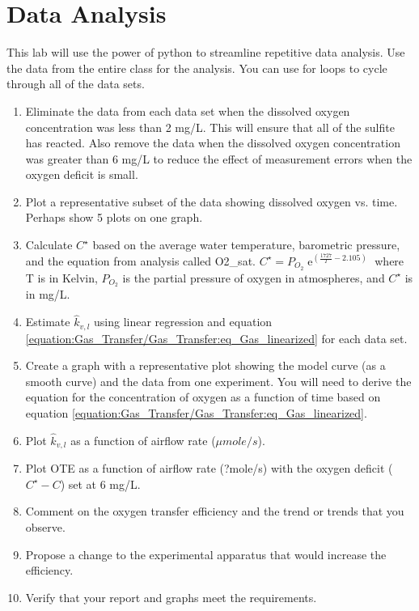 \documentclass[letterpaper,10pt,english]{sphinxmanual}
\begin{document}
\section{Data Analysis}
\label{\detokenize{Gas_Transfer/Gas_Transfer:data-analysis}}\label{\detokenize{Gas_Transfer/Gas_Transfer:heading-gas-transfer-data-analysis}}
This lab will use the power of python to streamline repetitive data analysis. Use the data from the entire class for the analysis. You can use for loops to cycle through all of the data sets.
\begin{enumerate}
\item {} 
Eliminate the data from each data set when the dissolved oxygen concentration was less than 2 mg/L. This will ensure that all of the sulfite has reacted. Also remove the data when the dissolved oxygen concentration was greater than 6 mg/L to reduce the effect of measurement errors when the oxygen deficit is small.

\item {} 
Plot a representative subset of the data showing dissolved oxygen vs. time. Perhaps show 5 plots on one graph.

\item {} 
Calculate \(C^{\star}\) based on the average water temperature, barometric pressure, and the equation from  analysis called O2\_sat. \(C^{\star} =P_{O_{2}} {\mathop{e}\nolimits^{\left(\frac{1727}{T} -2.105\right)}}\) where T is in Kelvin, \(P_{O_{2} }\) is the partial pressure of oxygen in atmospheres, and \(C^{\star}\) is in mg/L.

\item {} 
Estimate \(\hat{k}_{v,l}\) using linear regression and equation \eqref{equation:Gas_Transfer/Gas_Transfer:eq_Gas_linearized} for each data set.

\item {} 
Create a graph with a representative plot showing the model curve (as a smooth curve) and the data from one experiment. You will need to derive the equation for the concentration of oxygen as a function of time based on equation \eqref{equation:Gas_Transfer/Gas_Transfer:eq_Gas_linearized}.

\item {} 
Plot \(\hat{k}_{v,l}\) as a function of airflow rate (\(\mu mole/s\)).

\item {} 
Plot OTE as a function of airflow rate (?mole/s) with the oxygen deficit (\(C^{\star} -C\)) set at 6 mg/L.

\item {} 
Comment on the oxygen transfer efficiency and the trend or trends that you observe.

\item {} 
Propose a change to the experimental apparatus that would increase the efficiency.

\item {} 
Verify that your report and graphs meet the requirements.

\end{enumerate}
\end{document}
